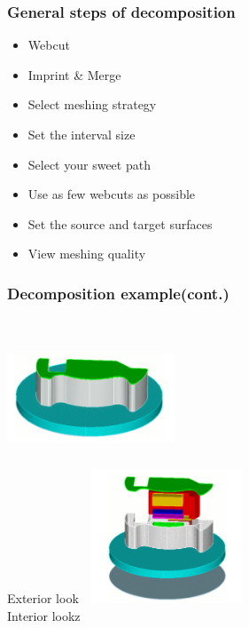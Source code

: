 \documentclass[fleqn]{beamer}
\begin{document}
\begin{frame}
\frametitle{General steps of decomposition}
\begin{itemize}
\item Webcut
\item Imprint \& Merge
\item Select meshing strategy 
\item Set the interval size
\item Select your sweet path
\item Use as few webcuts as possible
\item Set the source and target surfaces
\item View meshing quality   
\end{itemize}
\end{frame}



  \begin{frame}
 \frametitle{Decomposition example(cont.)}
 \begin{columns}[t]
 \centering
 \includegraphics[width=5cm,height=4cm]{figures/decomp_exterior.png}\\{Exterior look}
 \centering
 \includegraphics[width=5cm,height=4cm]{figures/decomp_interior.png}\\{Interior lookz}
 \end{columns}
 \end{frame}
 
\end{document}
